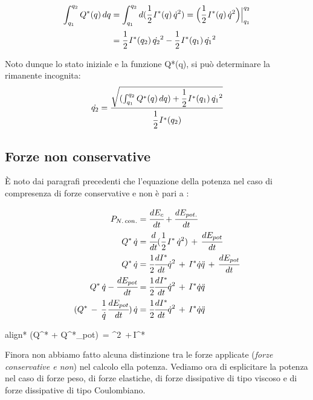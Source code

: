 	\begin{align*}
		\int_{q_1}^{q_2} Q^*(q)\,dq &= \int_{q_1}^{q_2} d (\cfrac{1}{2}\,I^*(q)\,\dot{q}^2) = 	\Bigl(\cfrac{1}{2}\,I^*(q)\,\dot{q}^2\Bigr)\Bigr|_{q_1}^{q_2}\\
		&= \cfrac{1}{2}\,I^*(q_2)\,\dot{q_2}^2 - \cfrac{1}{2}\,I^*(q_1)\,\dot{q_1}^2 
	\end{align*}
	
	Noto dunque lo stato iniziale e la funzione Q*(q), si può determinare la rimanente incognita:
	\[
	\dot{q_2} = \cfrac{\sqrt{(\int_{q_1}^{q_2} Q^*(q)\,dq) + \cfrac{1}{2}\,I^*(q_1)\,\dot{q_1}^2}}{\cfrac{1}{2}\,I^*(q_2)}
	\]
	
	\subsection{Forze non conservative}
	
	È noto dai paragrafi precedenti che l'equazione della potenza nel caso di compresenza di forze conservative e non è pari a :
	
	\begin{align*}
	P_{N.\,con.} &= \cfrac{dE_c}{dt} + \cfrac{dE_{pot.}}{dt}\\
	Q^*\,\dot{q} &= \cfrac{d}{dt}(\cfrac{1}{2}\,I^*\,\dot{q}^2)\,+\,\cfrac{dE_{pot}}{dt}\\
	Q^*\,\dot{q} &= \cfrac{1}{2}\cfrac{dI^*}{dt}\dot{q}^2 \,+\,I^*\dot{q}\ddot{q}\,+\,\cfrac{dE_{pot}}{dt}\\
	Q^*\,\dot{q} - \cfrac{dE_{pot}}{dt} &= \cfrac{1}{2}\cfrac{dI^*}{dt}\dot{q}^2 \,+\,I^*\dot{q}\ddot{q}\\
	(Q^*\,-\,\cfrac{1}{\dot{q}}\,\cfrac{dE_{pot}}{dt})\,\dot{q} &= \cfrac{1}{2}\cfrac{dI^*}{dt}\dot{q}^2 \,+\,I^*\dot{q}\ddot{q}
	\end{align*}
	
	\begin{empheq}[box=%
	\fbox]{align*}
	(Q^* + Q^*_{pot})\, =  ^2 \,+\,I^*
	\end{empheq}
	
	
	Finora non abbiamo fatto alcuna distinzione tra le forze applicate (\emph{forze conservative e non}) nel calcolo ella potenza. Vediamo ora di esplicitare la potenza nel caso di forze peso, di forze elastiche, di forze dissipative di tipo viscoso e di forze dissipative di tipo Coulombiano.
	
